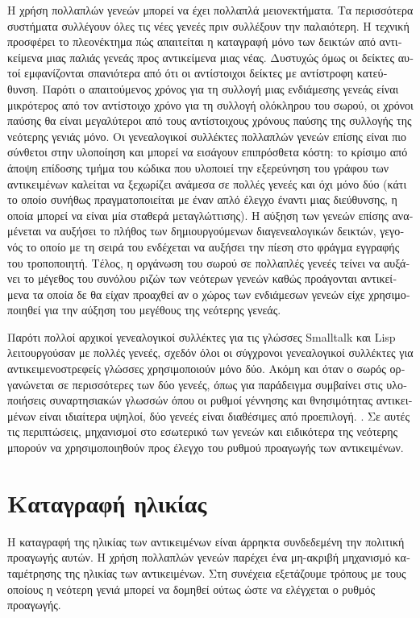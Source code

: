 \begin{greek}
Η χρήση πολλαπλών γενεών μπορεί να έχει πολλαπλά μειονεκτήματα. Τα περισσότερα συστήματα
συλλέγουν όλες τις νέες γενεές πριν συλλέξουν την παλαιότερη. Η τεχνική προσφέρει το
πλεονέκτημα πώς απαιτείται η καταγραφή μόνο των δεικτών από αντικείμενα μιας παλιάς γενεάς
προς αντικείμενα μιας νέας. Δυστυχώς όμως οι δείκτες αυτοί εμφανίζονται σπανιότερα από
ότι οι αντίστοιχοι δείκτες με αντίστροφη κατεύθυνση. Παρότι ο απαιτούμενος χρόνος για τη
συλλογή μιας ενδιάμεσης γενεάς είναι μικρότερος από τον αντίστοιχο χρόνο για τη συλλογή
ολόκληρου του σωρού, οι χρόνοι παύσης θα είναι μεγαλύτεροι από τους αντίστοιχους χρόνους
παύσης της συλλογής της νεότερης γενιάς μόνο. Οι γενεαλογικοί συλλέκτες πολλαπλών γενεών
επίσης είναι πιο σύνθετοι στην υλοποίηση και μπορεί να εισάγουν επιπρόσθετα κόστη: το
κρίσιμο από άποψη επίδοσης τμήμα του κώδικα που υλοποιεί την εξερεύνηση του γράφου των
αντικειμένων καλείται να ξεχωρίζει ανάμεσα σε πολλές γενεές και όχι μόνο δύο (κάτι το
οποίο συνήθως πραγματοποιείται με έναν απλό έλεγχο έναντι μιας διεύθυνσης, η οποία μπορεί
να είναι μία σταθερά μεταγλώττισης). Η αύξηση των γενεών επίσης αναμένεται να αυξήσει
το πλήθος των δημιουργούμενων διαγενεαλογικών δεικτών, γεγονός το οποίο με τη σειρά του
ενδέχεται να αυξήσει την πίεση στο φράγμα εγγραφής του τροποποιητή. Τέλος, η οργάνωση του
σωρού σε πολλαπλές γενεές τείνει να αυξάνει το μέγεθος του συνόλου ριζών των νεότερων 
γενεών καθώς προάγονται αντικείμενα τα οποία δε θα είχαν προαχθεί αν ο χώρος των 
ενδιάμεσων γενεών είχε χρησιμοποιηθεί για την αύξηση του μεγέθους της νεότερης γενεάς.

Παρότι πολλοί αρχικοί γενεαλογικοί συλλέκτες για τις γλώσσες Smalltalk και Lisp
λειτουργούσαν με πολλές γενεές, σχεδόν όλοι οι σύγχρονοι γενεαλογικοί συλλέκτες για
αντικειμενοστρεφείς γλώσσες χρησιμοποιούν μόνο δύο. Ακόμη και όταν ο σωρός οργανώνεται
σε περισσότερες των δύο γενεές, όπως για παράδειγμα συμβαίνει στις υλοποιήσεις
συναρτησιακών γλωσσών όπου οι ρυθμοί γέννησης και θνησιμότητας αντικειμένων είναι
ιδιαίτερα υψηλοί, δύο γενεές είναι διαθέσιμες από προεπιλογή. \cite{DBLP:conf/iwmm/MarlowHJJ08}. Σε αυτές
τις περιπτώσεις, μηχανισμοί στο εσωτερικό των γενεών και ειδικότερα της νεότερης
μπορούν να χρησιμοποιηθούν προς έλεγχο του ρυθμού προαγωγής των αντικειμένων.

\section{Καταγραφή ηλικίας}
Η καταγραφή της ηλικίας των αντικειμένων είναι άρρηκτα συνδεδεμένη την πολιτική
προαγωγής αυτών. Η χρήση πολλαπλών γενεών παρέχει ένα μη-ακριβή μηχανισμό καταμέτρησης
της ηλικίας των αντικειμένων. Στη συνέχεια εξετάζουμε τρόπους με τους οποίους η
νεότερη γενιά μπορεί να δομηθεί ούτως ώστε να ελέγχεται ο ρυθμός προαγωγής.


\end{greek}
